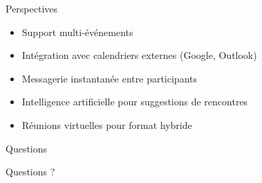 \documentclass{beamer}
\begin{document}
\begin{frame}{Perspectives}
\begin{itemize}
    \item Support multi-événements
    \item Intégration avec calendriers externes (Google, Outlook)
    \item Messagerie instantanée entre participants
    \item Intelligence artificielle pour suggestions de rencontres
    \item Réunions virtuelles pour format hybride
\end{itemize}
\end{frame}

\begin{frame}{Questions}
\begin{center}
\Huge{Questions ?}
\end{center}
\end{frame}
\end{document}
